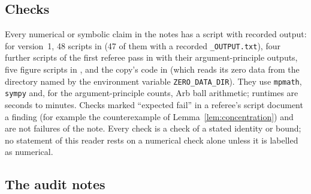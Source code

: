 \subsection{Checks}

Every numerical or symbolic claim in the notes has a script with recorded output: for version~1, 48 scripts in  (47 of them with a recorded \texttt{\_OUTPUT.txt}), four further scripts of the first referee pass in  with their argument-principle outputs, five figure scripts in , and the copy's code in  (which reads its zero data from the directory named by the environment variable \texttt{ZERO\_DATA\_DIR}). They use \texttt{mpmath}, \texttt{sympy} and, for the argument-principle counts, Arb ball arithmetic; runtimes are seconds to minutes. Checks marked ``expected fail'' in a referee's script document a finding (for example the counterexample of Lemma~\ref{lem:concentration}) and are not failures of the note. Every check is a check of a stated identity or bound; no statement of this reader rests on a numerical check alone unless it is labelled as numerical.

\subsection{The audit notes}


